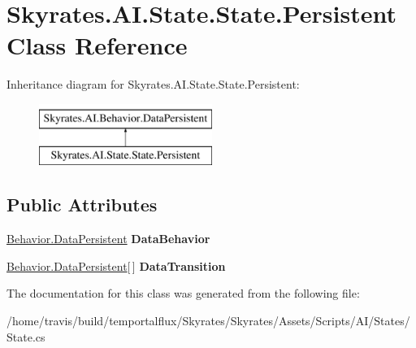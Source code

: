 \hypertarget{class_skyrates_1_1_a_i_1_1_state_1_1_state_1_1_persistent}{\section{Skyrates.\-A\-I.\-State.\-State.\-Persistent Class Reference}
\label{class_skyrates_1_1_a_i_1_1_state_1_1_state_1_1_persistent}
}
Inheritance diagram for Skyrates.\-A\-I.\-State.\-State.\-Persistent\-:\begin{figure}[H]
\begin{center}
\leavevmode
\includegraphics[height=2.000000cm]{class_skyrates_1_1_a_i_1_1_state_1_1_state_1_1_persistent}
\end{center}
\end{figure}
\subsection*{Public Attributes}
\begin{DoxyCompactItemize}
\item 
\hypertarget{class_skyrates_1_1_a_i_1_1_state_1_1_state_1_1_persistent_a2ae8c7cdd128923c8eeaf11fc9fb20f4}{\hyperlink{class_skyrates_1_1_a_i_1_1_behavior_1_1_data_persistent}{Behavior.\-Data\-Persistent} {\bfseries Data\-Behavior}}\label{class_skyrates_1_1_a_i_1_1_state_1_1_state_1_1_persistent_a2ae8c7cdd128923c8eeaf11fc9fb20f4}

\item 
\hypertarget{class_skyrates_1_1_a_i_1_1_state_1_1_state_1_1_persistent_aa6e40d406a5e0e1380b383a6eacbcbbc}{\hyperlink{class_skyrates_1_1_a_i_1_1_behavior_1_1_data_persistent}{Behavior.\-Data\-Persistent}\mbox{[}$\,$\mbox{]} {\bfseries Data\-Transition}}\label{class_skyrates_1_1_a_i_1_1_state_1_1_state_1_1_persistent_aa6e40d406a5e0e1380b383a6eacbcbbc}

\end{DoxyCompactItemize}


The documentation for this class was generated from the following file\-:\begin{DoxyCompactItemize}
\item 
/home/travis/build/temportalflux/\-Skyrates/\-Skyrates/\-Assets/\-Scripts/\-A\-I/\-States/State.\-cs\end{DoxyCompactItemize}
